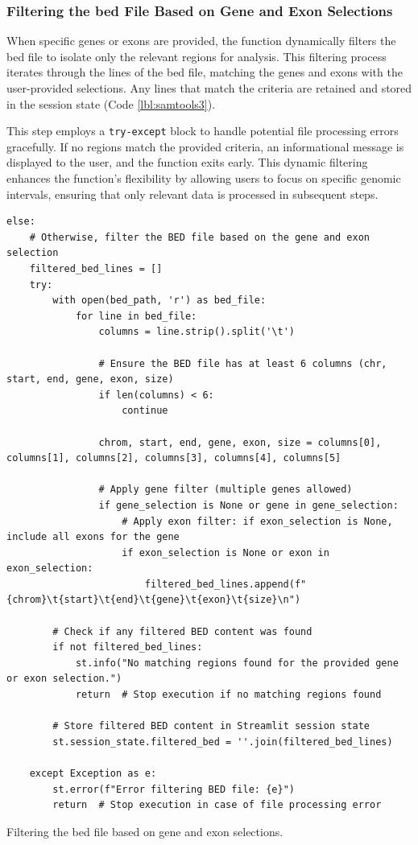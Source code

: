\subsubsection{\textbf{Filtering the \ac{bed} File Based on Gene and Exon Selections}}

When specific genes or exons are provided, the function dynamically filters the \ac{bed} file to isolate only the relevant regions for analysis. This filtering process iterates through the lines of the \ac{bed} file, matching the genes and exons with the user-provided selections. Any lines that match the criteria are retained and stored in the session state (Code \ref{lbl:samtools3}).

This step employs a \texttt{try-except} block to handle potential file processing errors gracefully. If no regions match the provided criteria, an informational message is displayed to the user, and the function exits early. This dynamic filtering enhances the function's flexibility by allowing users to focus on specific genomic intervals, ensuring that only relevant data is processed in subsequent steps.

\begin{longlisting}
\begin{verbatim}
else:
    # Otherwise, filter the BED file based on the gene and exon selection
    filtered_bed_lines = []
    try:
        with open(bed_path, 'r') as bed_file:
            for line in bed_file:
                columns = line.strip().split('\t')

                # Ensure the BED file has at least 6 columns (chr, start, end, gene, exon, size)
                if len(columns) < 6:
                    continue

                chrom, start, end, gene, exon, size = columns[0], columns[1], columns[2], columns[3], columns[4], columns[5]

                # Apply gene filter (multiple genes allowed)
                if gene_selection is None or gene in gene_selection:
                    # Apply exon filter: if exon_selection is None, include all exons for the gene
                    if exon_selection is None or exon in exon_selection:
                        filtered_bed_lines.append(f"{chrom}\t{start}\t{end}\t{gene}\t{exon}\t{size}\n")

        # Check if any filtered BED content was found
        if not filtered_bed_lines:
            st.info("No matching regions found for the provided gene or exon selection.")
            return  # Stop execution if no matching regions found

        # Store filtered BED content in Streamlit session state
        st.session_state.filtered_bed = ''.join(filtered_bed_lines)

    except Exception as e:
        st.error(f"Error filtering BED file: {e}")
        return  # Stop execution in case of file processing error
\end{verbatim}
\caption{Filtering the \ac{bed} file based on gene and exon selections.}
\label{lbl:samtools3}
\end{longlisting}

